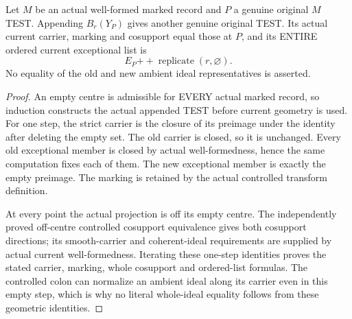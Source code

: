 \begin{theorem}
\label{hir:sharp-actual-identity-empty-padding-geometric-ledger}
\leanok
Let $M$ be an actual well-formed marked record and $P$ a genuine original
$M$ TEST. Appending $B_r(Y_P)$ gives another genuine original TEST. Its
actual current carrier, marking and cosupport equal those at $P$, and
its ENTIRE ordered current exceptional list is
\[
                         E_P\mathbin{+\!+}\operatorname{replicate}(r,\varnothing).
\]
No equality of the old and new ambient ideal representatives is asserted.
\end{theorem}
\begin{proof}
An empty centre is admissible for EVERY actual marked record, so induction
constructs the actual appended TEST before current geometry is used.
For one step, the strict carrier is the closure of its preimage under
the identity after deleting the empty set. The old carrier is closed,
so it is unchanged. Every old exceptional member is closed by actual
well-formedness, hence the same computation fixes each of them. The new
exceptional member is exactly the empty preimage. The marking is retained
by the actual controlled transform definition.

At every point the actual projection is off its empty centre. The
independently proved off-centre controlled cosupport equivalence gives
both cosupport directions; its smooth-carrier and coherent-ideal
requirements are supplied by actual current well-formedness. Iterating
these one-step identities proves the stated carrier, marking, whole
cosupport and ordered-list formulas. The controlled colon can normalize
an ambient ideal along its carrier even in this empty step, which is why
no literal whole-ideal equality follows from these geometric identities.
\end{proof}

